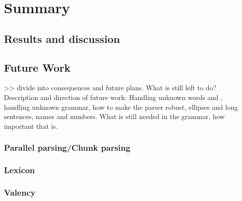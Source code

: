 \documentclass{report}
\begin{document}
\chapter{Summary}
\section{Results and discussion}
%
%


\section{Future Work}
\label{sec:future}
>> divide into consequences and future plans.
What is still left to do? Description and direction of future work:
Handling unknown words and , handling unknown grammar, 
how to make the parser robust, ellipses and long sentences, names and numbers.
What is still needed in the grammar, how important that is. 
\subsection{Parallel parsing/Chunk parsing}
\subsection{Lexicon}


\subsection{Valency}
\label{sec:futureValency}
\end{document}
